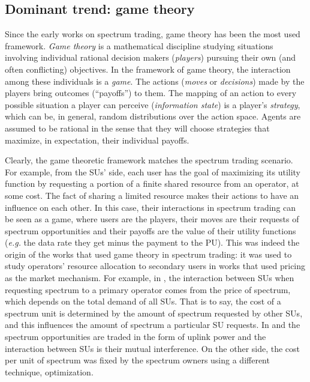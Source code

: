 \subsection{Dominant trend: game theory}
\label{sec:GameTheory}

Since the early works on spectrum trading, game theory \cite{ref:Myerson1997} has been the most used framework. 
\textit{Game theory} is a mathematical discipline studying situations involving individual rational decision makers (\textit{players}) pursuing their own (and often conflicting) objectives. 
In the framework of game theory, the interaction among these individuals is a \textit{game}. The actions (\textit{moves} or \textit{decisions}) made by the players bring outcomes (``payoffs'') to them.
The mapping of an action to every possible situation a player can perceive (\textit{information state}) is a player's \textit{strategy}, which can be, in general, random distributions over the action space. Agents are assumed to be rational in the sense that they will choose strategies that maximize, in expectation, their individual payoffs.

Clearly, the game theoretic framework matches the spectrum trading scenario.
For example, from the SUs' side, each user has the goal of maximizing its utility function by requesting a portion of a finite shared resource from an operator, at some cost. 
The fact of sharing a limited resource makes their actions to have an influence on each other. 
In this case, their interactions in spectrum trading can be seen as a game, where users are the players, their moves are their requests of spectrum opportunities and their payoffs are the value of their utility functions (\textit{e.g.} the data rate they get minus the payment to the PU).
This was indeed the origin of the works that used game theory in spectrum trading: it was used to study operators' resource allocation to secondary users in works that used pricing as the market mechanism.
For example, in \cite{ref:Niyato2007_Game}, the interaction between SUs when requesting spectrum to a primary operator comes from the price of spectrum, which depends on the total demand of all SUs. 
That is to say, the cost of a spectrum unit is determined by the amount of spectrum requested by other SUs, and this influences the amount of spectrum a particular SU requests. 
In \cite{ref:Yu2010} and \cite{ref:Wang2008} the spectrum opportunities are traded in the form of uplink power and the interaction between SUs is their mutual interference. 
On the other side, the cost per unit of spectrum was fixed by the spectrum owners using a different technique, optimization.

